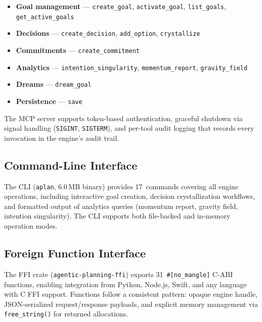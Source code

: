\documentclass[10pt, twocolumn]{article}
\begin{document}
\begin{itemize}[nosep, leftmargin=*]
  \item \textbf{Goal management} --- \texttt{create\_goal}, \texttt{activate\_goal}, \texttt{list\_goals}, \texttt{get\_active\_goals}
  \item \textbf{Decisions} --- \texttt{create\_decision}, \texttt{add\_option}, \texttt{crystallize}
  \item \textbf{Commitments} --- \texttt{create\_commitment}
  \item \textbf{Analytics} --- \texttt{intention\_singularity}, \texttt{momentum\_report}, \texttt{gravity\_field}
  \item \textbf{Dreams} --- \texttt{dream\_goal}
  \item \textbf{Persistence} --- \texttt{save}
\end{itemize}

The MCP server supports token-based authentication, graceful shutdown via signal handling (\texttt{SIGINT}, \texttt{SIGTERM}), and per-tool audit logging that records every invocation in the engine's audit trail.

\subsection{Command-Line Interface}
\label{sec:cli}

The CLI (\texttt{aplan}, 6.0\,MB binary) provides 17~commands covering all engine operations, including interactive goal creation, decision crystallization workflows, and formatted output of analytics queries (momentum report, gravity field, intention singularity). The CLI supports both file-backed and in-memory operation modes.

\subsection{Foreign Function Interface}
\label{sec:ffi}

The FFI crate (\texttt{agentic-planning-ffi}) exports 31~\texttt{\#[no\_mangle]} C-ABI functions, enabling integration from Python, Node.js, Swift, and any language with C FFI support. Functions follow a consistent pattern: opaque engine handle, JSON-serialized request/response payloads, and explicit memory management via \texttt{free\_string()} for returned allocations.
\end{document}

